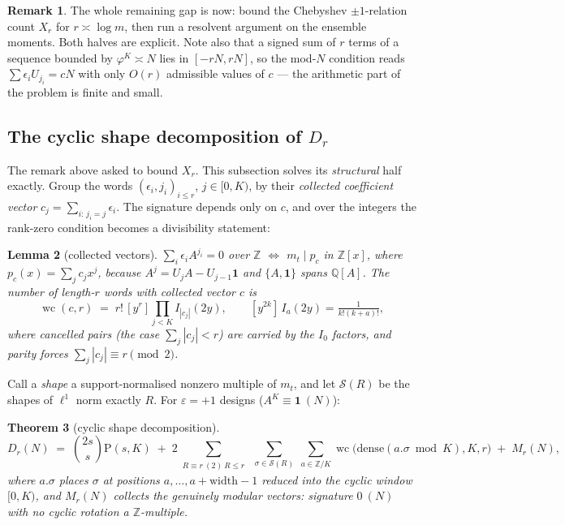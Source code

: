 \documentclass[11pt,reqno]{amsart}
\newtheorem{theorem}{Theorem}[section]
\newtheorem{lemma}[theorem]{Lemma}
\theoremstyle{definition}
\newtheorem{remark}[theorem]{Remark}
\newcommand{\ZZ}{\mathbb{Z}}
\begin{document}
\begin{remark}
The whole remaining gap is now: bound the Chebyshev $\pm1$-relation count $X_r$ for
$r\asymp\log m$, then run a resolvent argument on the ensemble moments. Both halves
are explicit. Note also that a signed sum of $r$ terms of a sequence bounded by
$\varphi^K\asymp N$ lies in $[-rN,rN]$, so the mod-$N$ condition reads
$\sum\epsilon_iU_{j_i}=cN$ with only $O(r)$ admissible values of $c$ --- the
arithmetic part of the problem is finite and small.
\end{remark}

\subsection{The cyclic shape decomposition of \texorpdfstring{$D_r$}{Dr}}\label{sub:thmH}

The remark above asked to bound $X_r$.  This subsection solves its
\emph{structural} half exactly.  Group the words $(\epsilon_i,j_i)_{i\le r}$,
$j\in[0,K)$, by their \emph{collected coefficient vector}
$c_j=\sum_{i:\,j_i=j}\epsilon_i$.  The signature depends only on $c$, and over
the integers the rank-zero condition becomes a divisibility statement:

\begin{lemma}[collected vectors]\label{lem:coll}
$\sum_i\epsilon_iA^{j_i}=0$ over $\ZZ$ $\iff$ $m_t\mid p_c$ in $\ZZ[x]$, where
$p_c(x)=\sum_jc_jx^j$, because $A^j=U_jA-U_{j-1}\mathbf 1$ and $\{A,\mathbf 1\}$
spans $\mathbb Q[A]$.  The number of length-$r$ words with collected vector $c$ is
\[
  \operatorname{wc}(c,r)\;=\;r!\,[y^r]\prod_{j<K}I_{|c_j|}(2y),
  \qquad [y^{2k}]\,I_a(2y)=\tfrac1{k!(k+a)!},
\]
where cancelled pairs (the case $\sum_j|c_j|<r$) are carried by the $I_0$
factors, and parity forces $\sum_j|c_j|\equiv r \pmod 2$.
\end{lemma}

Call a \emph{shape} a support-normalised nonzero multiple of $m_t$, and let
$\mathcal S(R)$ be the shapes of $\ell^1$ norm exactly $R$.  For
$\varepsilon=+1$ designs ($A^K\equiv\mathbf 1\ (N)$):

\begin{theorem}[cyclic shape decomposition]\label{thm:H}
\[
  D_r(N)\;=\;\binom{2s}{s}\mathrm P(s,K)\;+\;
  2\!\!\sum_{\substack{R\equiv r\ (2)\ R\le r}}\;\sum_{\sigma\in\mathcal S(R)}
  \;\sum_{a\in\mathbb Z/K}\operatorname{wc}\bigl(\mathrm{dense}(a.\sigma\bmod K),K,r\bigr)
  \;+\;M_r(N),
\]
where $a.\sigma$ places $\sigma$ at positions $a,\dots,a+\mathrm{width}-1$
reduced into the cyclic window $[0,K)$, and $M_r(N)$ collects the genuinely
modular vectors: signature $0\ (N)$ with no cyclic rotation a $\ZZ$-multiple.
\end{theorem}
\end{document}

